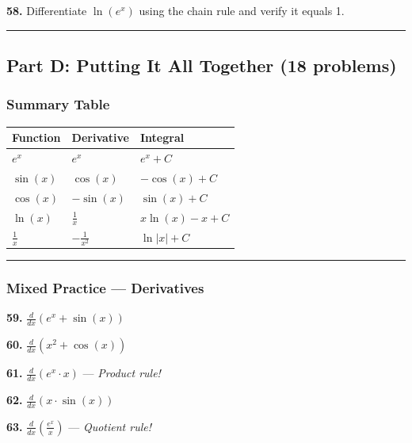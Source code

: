 \documentclass[
  11pt,
]{article}
\begin{document}
\textbf{58.} Differentiate \(\ln(e^x)\) using the chain rule and verify
it equals 1.

\begin{center}\rule{0.5\linewidth}{0.5pt}\end{center}

\hypertarget{part-d-putting-it-all-together-18-problems}{%
\subsection{Part D: Putting It All Together (18
problems)}\label{part-d-putting-it-all-together-18-problems}}

\hypertarget{summary-table}{%
\subsubsection{Summary Table}\label{summary-table}}

\begin{longtable}[]{@{}lll@{}}
\toprule\noalign{}
Function & Derivative & Integral \\
\midrule\noalign{}
\endhead
\bottomrule\noalign{}
\endlastfoot
\(e^x\) & \(e^x\) & \(e^x + C\) \\
\(\sin(x)\) & \(\cos(x)\) & \(-\cos(x) + C\) \\
\(\cos(x)\) & \(-\sin(x)\) & \(\sin(x) + C\) \\
\(\ln(x)\) & \(\frac{1}{x}\) & \(x\ln(x) - x + C\) \\
\(\frac{1}{x}\) & \(-\frac{1}{x^2}\) & \(\ln|x| + C\) \\
\end{longtable}

\begin{center}\rule{0.5\linewidth}{0.5pt}\end{center}

\hypertarget{mixed-practice-derivatives}{%
\subsubsection{Mixed Practice ---
Derivatives}\label{mixed-practice-derivatives}}

\textbf{59.} \(\frac{d}{dx}(e^x + \sin(x))\)

\textbf{60.} \(\frac{d}{dx}(x^2 + \cos(x))\)

\textbf{61.} \(\frac{d}{dx}(e^x \cdot x)\) --- \emph{Product rule!}

\textbf{62.} \(\frac{d}{dx}(x \cdot \sin(x))\)

\textbf{63.} \(\frac{d}{dx}\left(\frac{e^x}{x}\right)\) ---
\emph{Quotient rule!}
\end{document}
